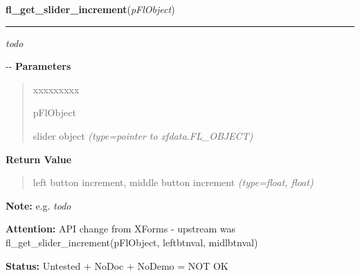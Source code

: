 \hspace{.8\funcindent}\begin{boxedminipage}{\funcwidth}

    \raggedright \textbf{fl\_get\_slider\_increment}(\textit{pFlObject})

    \vspace{-1.5ex}

    \rule{\textwidth}{0.5\fboxrule}
\setlength{\parskip}{2ex}

\emph{todo}

-{}-
\setlength{\parskip}{1ex}
      \textbf{Parameters}
      \vspace{-1ex}

      \begin{quote}
        \begin{Ventry}{xxxxxxxxx}

          \item[pFlObject]


slider object
            {\it (type=pointer to xfdata.FL\_OBJECT)}

        \end{Ventry}

      \end{quote}

      \textbf{Return Value}
    \vspace{-1ex}

      \begin{quote}

left button increment, middle button increment
      {\it (type=float, float)}

      \end{quote}

\textbf{Note:} 
e.g. \emph{todo}


\textbf{Attention:} 
API change from XForms - upstream was
fl\_get\_slider\_increment(pFlObject, leftbtnval, midlbtnval)


\textbf{Status:} 
Untested + NoDoc + NoDemo = NOT OK


    \end{boxedminipage}

    \label{xformslib:flslider:fl_set_slider_size}

    \vspace{0.5ex}

